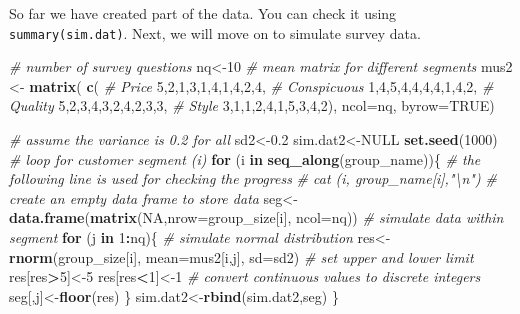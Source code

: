 \documentclass[12pt,]{krantz}
\makeatletter
\newenvironment{Shaded}{\begin{snugshade}}{\end{snugshade}}
\newcommand{\CommentTok}[1]{\textcolor[rgb]{0.37,0.37,0.37}{\textit{#1}}}
\newcommand{\ControlFlowTok}[1]{\textcolor[rgb]{0.27,0.27,0.27}{\textbf{#1}}}
\newcommand{\DataTypeTok}[1]{\textcolor[rgb]{0.27,0.27,0.27}{#1}}
\newcommand{\DecValTok}[1]{\textcolor[rgb]{0.06,0.06,0.06}{#1}}
\newcommand{\FloatTok}[1]{\textcolor[rgb]{0.06,0.06,0.06}{#1}}
\newcommand{\KeywordTok}[1]{\textcolor[rgb]{0.27,0.27,0.27}{\textbf{#1}}}
\newcommand{\NormalTok}[1]{#1}
\newcommand{\OperatorTok}[1]{\textcolor[rgb]{0.43,0.43,0.43}{\textbf{#1}}}
\newcommand{\OtherTok}[1]{\textcolor[rgb]{0.37,0.37,0.37}{#1}}
\newcommand{\StringTok}[1]{\textcolor[rgb]{0.5,0.5,0.5}{#1}}
\newenvironment{kframe}{%
\medskip{}
\setlength{\fboxsep}{.8em}
 \def\at@end@of@kframe{}%
 \ifinner\ifhmode%
  \def\at@end@of@kframe{\end{minipage}}%
  \begin{minipage}{\columnwidth}%
 \fi\fi%
 \def\FrameCommand##1{\hskip\@totalleftmargin \hskip-\fboxsep
 \colorbox{shadecolor}{##1}\hskip-\fboxsep
     \hskip-\linewidth \hskip-\@totalleftmargin \hskip\columnwidth}%
 \MakeFramed {\advance\hsize-\width
   \@totalleftmargin\z@ \linewidth\hsize
   \@setminipage}}%
 {\par\unskip\endMakeFramed%
 \at@end@of@kframe}
\renewenvironment{Shaded}{\begin{kframe}}{\end{kframe}}
\makeatother
\begin{document}
So far we have created part of the data. You can check it using \texttt{summary(sim.dat)}. Next, we will move on to simulate survey data.

\begin{Shaded}
\begin{Highlighting}[]
\CommentTok{# number of survey questions}
\NormalTok{nq<-}\DecValTok{10}
\CommentTok{# mean matrix for different segments }
\NormalTok{mus2 <-}\StringTok{ }\KeywordTok{matrix}\NormalTok{( }\KeywordTok{c}\NormalTok{(}
  \CommentTok{# Price}
 \DecValTok{5}\NormalTok{,}\DecValTok{2}\NormalTok{,}\DecValTok{1}\NormalTok{,}\DecValTok{3}\NormalTok{,}\DecValTok{1}\NormalTok{,}\DecValTok{4}\NormalTok{,}\DecValTok{1}\NormalTok{,}\DecValTok{4}\NormalTok{,}\DecValTok{2}\NormalTok{,}\DecValTok{4}\NormalTok{,}
  \CommentTok{# Conspicuous}
 \DecValTok{1}\NormalTok{,}\DecValTok{4}\NormalTok{,}\DecValTok{5}\NormalTok{,}\DecValTok{4}\NormalTok{,}\DecValTok{4}\NormalTok{,}\DecValTok{4}\NormalTok{,}\DecValTok{4}\NormalTok{,}\DecValTok{1}\NormalTok{,}\DecValTok{4}\NormalTok{,}\DecValTok{2}\NormalTok{,}
  \CommentTok{# Quality}
 \DecValTok{5}\NormalTok{,}\DecValTok{2}\NormalTok{,}\DecValTok{3}\NormalTok{,}\DecValTok{4}\NormalTok{,}\DecValTok{3}\NormalTok{,}\DecValTok{2}\NormalTok{,}\DecValTok{4}\NormalTok{,}\DecValTok{2}\NormalTok{,}\DecValTok{3}\NormalTok{,}\DecValTok{3}\NormalTok{,}
  \CommentTok{# Style}
 \DecValTok{3}\NormalTok{,}\DecValTok{1}\NormalTok{,}\DecValTok{1}\NormalTok{,}\DecValTok{2}\NormalTok{,}\DecValTok{4}\NormalTok{,}\DecValTok{1}\NormalTok{,}\DecValTok{5}\NormalTok{,}\DecValTok{3}\NormalTok{,}\DecValTok{4}\NormalTok{,}\DecValTok{2}\NormalTok{), }\DataTypeTok{ncol=}\NormalTok{nq, }\DataTypeTok{byrow=}\OtherTok{TRUE}\NormalTok{)}

\CommentTok{# assume the variance is 0.2 for all}
\NormalTok{sd2<-}\FloatTok{0.2}
\NormalTok{sim.dat2<-}\OtherTok{NULL}
\KeywordTok{set.seed}\NormalTok{(}\DecValTok{1000}\NormalTok{)}
\CommentTok{# loop for customer segment (i)}
\ControlFlowTok{for}\NormalTok{ (i }\ControlFlowTok{in} \KeywordTok{seq_along}\NormalTok{(group_name))\{}
  \CommentTok{# the following line is used for checking the progress}
  \CommentTok{# cat (i, group_name[i],"\textbackslash{}n")}
  \CommentTok{# create an empty data frame to store data}
\NormalTok{  seg<-}\KeywordTok{data.frame}\NormalTok{(}\KeywordTok{matrix}\NormalTok{(}\OtherTok{NA}\NormalTok{,}\DataTypeTok{nrow=}\NormalTok{group_size[i], }\DataTypeTok{ncol=}\NormalTok{nq))  }
  \CommentTok{# simulate data within segment}
  \ControlFlowTok{for}\NormalTok{ (j }\ControlFlowTok{in} \DecValTok{1}\OperatorTok{:}\NormalTok{nq)\{}
    \CommentTok{# simulate normal distribution}
\NormalTok{    res<-}\KeywordTok{rnorm}\NormalTok{(group_size[i], }\DataTypeTok{mean=}\NormalTok{mus2[i,j], }\DataTypeTok{sd=}\NormalTok{sd2)}
    \CommentTok{# set upper and lower limit}
\NormalTok{    res[res}\OperatorTok{>}\DecValTok{5}\NormalTok{]<-}\DecValTok{5}
\NormalTok{    res[res}\OperatorTok{<}\DecValTok{1}\NormalTok{]<-}\DecValTok{1}
    \CommentTok{# convert continuous values to discrete integers}
\NormalTok{    seg[,j]<-}\KeywordTok{floor}\NormalTok{(res)}
\NormalTok{  \}}
\NormalTok{  sim.dat2<-}\KeywordTok{rbind}\NormalTok{(sim.dat2,seg)}
\NormalTok{\}}


\end{Highlighting}
\end{Shaded}
\end{document}
